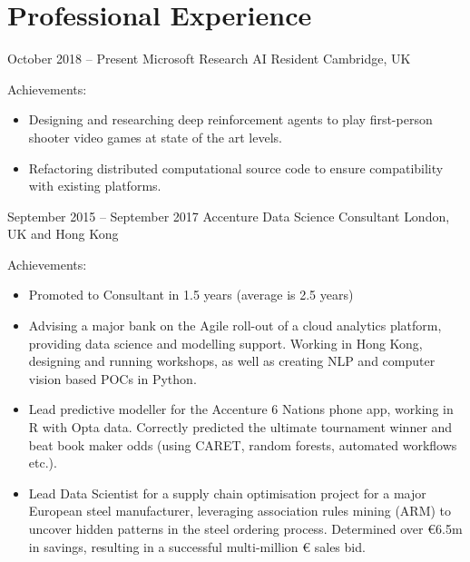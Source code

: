 \documentclass[]{friggeri-cv} %
\begin{document}

\section{Professional Experience}


\begin{entrylist}


\entry
{October 2018 -- Present}
{Microsoft Research}
{AI Resident}
{Cambridge, UK}
{Achievements:
\begin{itemize}
    \item Designing and researching deep reinforcement agents to play first-person shooter video games at state of the art levels.
    \item Refactoring distributed computational source code to ensure compatibility with existing platforms.
\end{itemize}
}

\entry
{September 2015 -- September 2017}
{Accenture}
{Data Science Consultant}
{London, UK and Hong Kong}
{Achievements:
\begin{itemize}
    \item Promoted to Consultant in 1.5 years (average is 2.5 years)
    \item Advising a major bank on the Agile roll-out of a cloud analytics platform, providing data
    science and modelling support. Working in Hong Kong, designing and running workshops,
    as well as creating NLP and computer vision based POCs in Python.
    \item Lead predictive modeller for the Accenture 6 Nations phone app, working in R with Opta
    data. Correctly predicted the ultimate tournament winner and beat book maker odds
    (using CARET, random forests, automated workflows etc.).
    \item Lead Data Scientist for a supply chain optimisation project for a major European steel
    manufacturer, leveraging association rules mining (ARM) to uncover hidden patterns in
    the steel ordering process. Determined over €6.5m in savings, resulting in a successful
    multi-million € sales bid.
\end{itemize}}






\end{entrylist}
\end{document}
